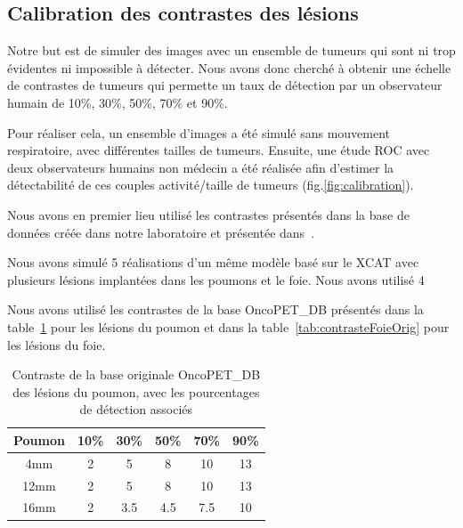 \subsection{Calibration des contrastes des lésions}

Notre but est de simuler des images avec un ensemble de tumeurs qui sont ni trop évidentes ni impossible à détecter. Nous avons donc cherché à obtenir une échelle de contrastes de tumeurs qui permette un taux de détection par un observateur humain de 10\%, 30\%, 50\%, 70\% et 90\%.

Pour réaliser cela, un ensemble d'images a été simulé sans mouvement respiratoire, avec différentes tailles de tumeurs. Ensuite, une étude ROC avec deux observateurs humains non médecin a été réalisée afin d'estimer la détectabilité de ces couples activité/taille de tumeurs (fig.\ref{fig:calibration}). 

Nous avons en premier lieu utilisé les contrastes présentés dans la base de données créée dans notre laboratoire et présentée dans~\cite{tomei2010oncopet_db}.

Nous avons simulé 5 réalisations d'un même modèle basé sur le XCAT avec plusieurs lésions implantées dans les poumons et le foie. Nous avons utilisé 4 

Nous avons utilisé les contrastes de la base OncoPET_DB présentés dans la table~\ref{tab:contrastePoumonOrig} pour les lésions du poumon et dans la table~\ref{tab:contrasteFoieOrig} pour les lésions du foie.



\begin{table}
\centering
\begin{tabular}{|c||c|c|c|c|c|}
 \hline
Poumon	& 10\% & 30\% & 50\% & 70\% & 90\% \\
\hline
4mm	& 2    &  5   &  8   & 10   & 13   \\
\hline
12mm    & 2    &  5   &  8   & 10   & 13   \\
\hline
16mm    & 2    &  3.5 &  4.5 & 7.5  & 10   \\
\hline
\end{tabular}
\caption[Contraste de la base originale OncoPET\_DB des lésions du poumon pour létude de détectabilité]{Contraste de la base originale OncoPET\_DB des lésions du poumon, avec les pourcentages de détection associés}
\label{tab:contrastePoumonOrig}
\end{table}

